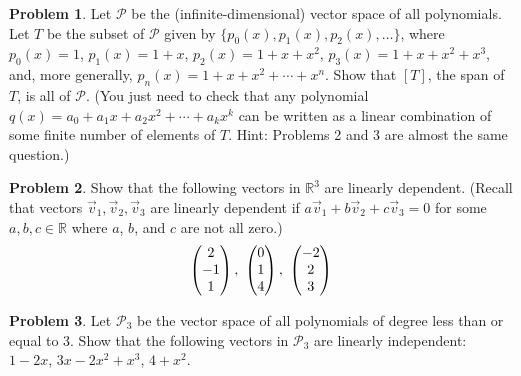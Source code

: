 \documentclass[12pt]{article}
\newcommand{\R}{{\mathbb R}}
\theoremstyle{definition}
\newtheorem{problem}{Problem}
\newenvironment{answer}{\par\bigskip\bgroup\color{darkblue}}{\egroup}
\begin{document}
\begin{answer}
\end{answer}



\begin{problem}
Let $\mathscr P$ be the (infinite-dimensional) vector space of all polynomials. 
Let $T$ be the subset of $\mathscr P$ given by $\{p_0(x),p_1(x),p_2(x),\dots\}$,
where $p_0(x)=1$, $p_1(x)=1+x$, $p_2(x)=1+x+x^2$, $p_3(x)=1+x+x^2+x^3$, and,
more generally, $p_n(x)=1+x+x^2+\cdots+x^n$.  Show that $[T]$, the span
of $T$, is all of $\mathscr P$.  (You just need to check that any polynomial 
$q(x)=a_0+a_1x+a_2x^2+\cdots+a_kx^k$ can be written as a linear combination of
some finite number of elements of $T$.  Hint: Problems 2 and 3 are almost the
same question.)
\end{problem}

\begin{answer}
\end{answer}



\begin{problem}
Show that the following vectors in $\R^3$ are linearly dependent. (Recall that vectors
$\vec v_1,\vec v_2,\vec v_3$ are linearly dependent if $a\vec v_1+b\vec v_2+c\vec v_3=0$
for some $a,b,c\in\R$ where $a$, $b$, and $c$ are not all zero.)
$$\vc{2\\-1\\1},\ \vc{0\\1\\4},\ \vc{-2\\2\\3}$$
\end{problem}

\begin{answer}
\end{answer}



\begin{problem}
Let ${\mathscr P}_3$ be the vector space of all polynomials of degree less than 
or equal to 3.  Show that the following vectors in ${\mathscr P}_3$ are linearly 
independent:\ \ $1-2x$, $3x-2x^2+x^3$, $4+x^2$.
\end{problem}

\begin{answer}
\end{answer}
\end{document}
